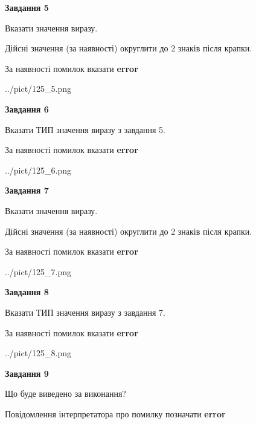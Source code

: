 \documentclass[11pt, ukrainian]{article}
\begin{document}
{\begin {large}
{\begin {center}\textbf{Завдання 5}\end {center}}\par
Вказати значення виразу. \par
Дійсні значення (за наявності) округлити до 2 знаків після крапки. \par
За наявності помилок вказати \textbf{error}

\begin{center}
	{../pict/125_5.png}
\end{center}
\newpage

{\begin {center}\textbf{Завдання 6}\end {center}}\par
Вказати ТИП значення виразу з завдання 5. \par
За наявності помилок вказати \textbf{error}

\begin{center}
	{../pict/125_6.png}
\end{center}
\newpage

{\begin {center}\textbf{Завдання 7}\end {center}}\par
Вказати значення виразу. \par
Дійсні значення (за наявності) округлити до 2 знаків після крапки. \par
За наявності помилок вказати \textbf{error}

\begin{center}
	{../pict/125_7.png}
\end{center}
\newpage

{\begin {center}\textbf{Завдання 8}\end {center}}\par
Вказати ТИП значення виразу з завдання 7. \par
За наявності помилок вказати \textbf{error}

\begin{center}
	{../pict/125_8.png}
\end{center}
\newpage

{\begin {center}\textbf{Завдання 9}\end {center}}\par
Що буде виведено за виконання? \par
Повідомлення інтерпретатора про помилку позначати \textbf{error}


\end{large}}
\end{document}
